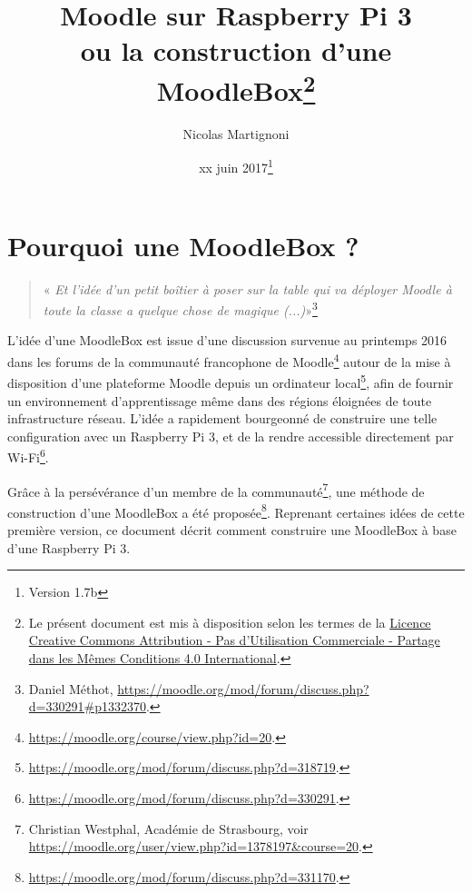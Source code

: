 \documentclass[11pt]{article}
\begin{document}
\title{Moodle sur Raspberry Pi 3\\ ou la construction d'une MoodleBox\footnote{Le présent document est mis à disposition selon les termes de la \href{http://creativecommons.org/licenses/by-nc-sa/4.0/}{Licence Creative Commons Attribution - Pas d'Utilisation Commerciale - Partage dans les Mêmes Conditions 4.0 International}.}}
\date{xx juin 2017\footnote{Version 1.7b}} %
\author{Nicolas Martignoni}
\maketitle

\begingroup
\setlength{\parskip}{0pt}
\tableofcontents
\endgroup

\section{Pourquoi une MoodleBox ?}

\begin{quote}
\noindent « \emph{Et l'idée d'un petit boîtier à poser sur la table qui va déployer Moodle à toute la classe a quelque chose de magique (...)}»\footnote{Daniel Méthot, \url{https://moodle.org/mod/forum/discuss.php?d=330291\#p1332370}.}
\end{quote}

L'idée d'une MoodleBox est issue d'une discussion survenue au printemps 2016 dans les forums de la communauté francophone de Moodle\footnote{\url{https://moodle.org/course/view.php?id=20}.} autour de la mise à disposition d'une plateforme Moodle depuis un ordinateur local\footnote{\url{https://moodle.org/mod/forum/discuss.php?d=318719}.}, afin de fournir un environnement d'apprentissage même dans des régions éloignées de toute infrastructure réseau. L'idée a rapidement bourgeonné de construire une telle configuration avec un Raspberry Pi 3, et de la rendre accessible directement par Wi-Fi\footnote{\url{https://moodle.org/mod/forum/discuss.php?d=330291}.}.

Grâce à la persévérance d'un membre de la communauté\footnote{Christian Westphal, Académie de Strasbourg, voir \url{https://moodle.org/user/view.php?id=1378197&course=20}.}, une méthode de construction d'une MoodleBox a été proposée\footnote{\url{https://moodle.org/mod/forum/discuss.php?d=331170}.}. Reprenant certaines idées de cette première version, ce document décrit comment construire une MoodleBox à base d'une Raspberry Pi 3.
\end{document}
